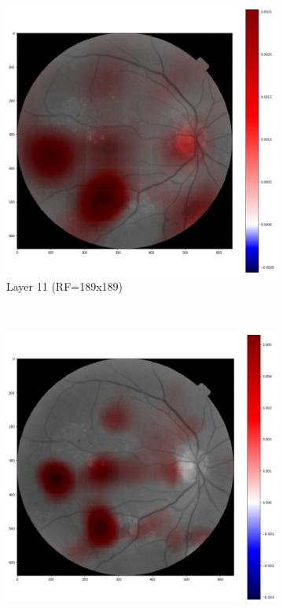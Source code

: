 \documentclass[review]{elsarticle}
\theoremstyle{definition} %
\theoremstyle{remark}
\begin{document}
\begin{figure}[!ht]
\begin{subfigure}{0.45\textwidth}
		\includegraphics[width=\textwidth]{./figures/maps/rf189c.png}
		\caption{Layer 11 (RF=189x189)}
		\label{fig:score_rf189}
	\end{subfigure}\\
	\begin{subfigure}{0.45\textwidth}
		\includegraphics[width=\textwidth]{./figures/maps/rf125c.png}

\end{subfigure}
\end{figure}
\end{document}
